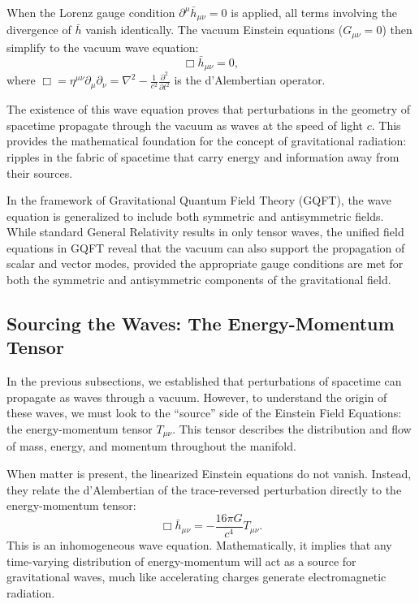 When the Lorenz gauge condition $\partial^{\mu}\bar{h}_{\mu\nu} = 0$ is applied, all terms involving the divergence of $\bar{h}$ vanish identically. The vacuum Einstein equations ($G_{\mu\nu} = 0$) then simplify to the vacuum wave equation:
\[%
  \Box \bar{h}_{\mu\nu} = 0
,\]%
where $\Box = \eta^{\mu\nu}\partial_{\mu}\partial_{\nu} = \nabla^2 - \frac{1}{c^2}\frac{\partial^2}{\partial t^2}$ is the d'Alembertian operator.

The existence of this wave equation proves that perturbations in the geometry of spacetime propagate through the vacuum as waves at the speed of light $c$. This provides the mathematical foundation for the concept of gravitational radiation: ripples in the fabric of spacetime that carry energy and information away from their sources.

In the framework of Gravitational Quantum Field Theory (GQFT), the wave equation is generalized to include both symmetric and antisymmetric fields. While standard General Relativity results in only tensor waves, the unified field equations in GQFT reveal that the vacuum can also support the propagation of scalar and vector modes, provided the appropriate gauge conditions are met for both the symmetric and antisymmetric components of the gravitational field.

\subsection{Sourcing the Waves: The Energy-Momentum Tensor}
\label{sub_sec:sourcing_the_waves_the_energy_momentum_tensor}

In the previous subsections, we established that perturbations of spacetime can propagate as waves through a vacuum. However, to understand the origin of these waves, we must look to the ``source'' side of the Einstein Field Equations: the energy-momentum tensor $T_{\mu\nu}$. This tensor describes the distribution and flow of mass, energy, and momentum throughout the manifold.

When matter is present, the linearized Einstein equations do not vanish. Instead, they relate the d'Alembertian of the trace-reversed perturbation directly to the energy-momentum tensor:
\[%
  \Box \bar{h}_{\mu\nu} = -\frac{16\pi G}{c^4} T_{\mu\nu}
.\]%
This is an inhomogeneous wave equation. Mathematically, it implies that any time-varying distribution of energy-momentum will act as a source for gravitational waves, much like accelerating charges generate electromagnetic radiation.

